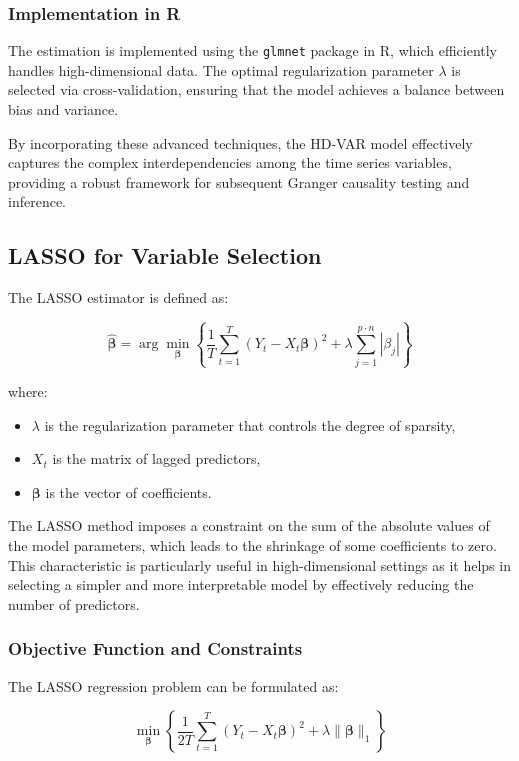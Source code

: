 \documentclass[12pt]{article}
\begin{document}
\subsubsection{Implementation in R}

The estimation is implemented using the \texttt{glmnet} package in R, which efficiently handles high-dimensional data. The optimal regularization parameter \(\lambda\) is selected via cross-validation, ensuring that the model achieves a balance between bias and variance.

By incorporating these advanced techniques, the HD-VAR model effectively captures the complex interdependencies among the time series variables, providing a robust framework for subsequent Granger causality testing and inference.


\subsection{LASSO for Variable Selection}
The LASSO estimator is defined as:

\[
\hat{\boldsymbol{\beta}} = \arg\min_{\boldsymbol{\beta}} \left\{ \frac{1}{T} \sum_{t=1}^T \left( Y_t - X_t \boldsymbol{\beta} \right)^2 + \lambda \sum_{j=1}^{p \cdot n} |\beta_j| \right\}
\]

where:
\begin{itemize}
    \item \(\lambda\) is the regularization parameter that controls the degree of sparsity,
    \item \(X_t\) is the matrix of lagged predictors,
    \item \(\boldsymbol{\beta}\) is the vector of coefficients.
\end{itemize}

The LASSO method imposes a constraint on the sum of the absolute values of the model parameters, which leads to the shrinkage of some coefficients to zero. This characteristic is particularly useful in high-dimensional settings as it helps in selecting a simpler and more interpretable model by effectively reducing the number of predictors.

\subsubsection{Objective Function and Constraints}

The LASSO regression problem can be formulated as:

\[
\min_{\boldsymbol{\beta}} \left\{ \frac{1}{2T} \sum_{t=1}^T \left( Y_t - X_t \boldsymbol{\beta} \right)^2 + \lambda \|\boldsymbol{\beta}\|_1 \right\}
\]
\end{document}
